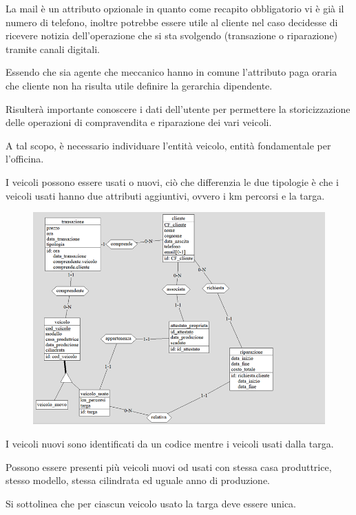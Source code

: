 \documentclass[a4paper,12pt]{report}
\begin{document}
La mail è un attributo opzionale in quanto come recapito obbligatorio vi è già il numero di telefono, inoltre potrebbe essere utile al 
%
cliente nel caso decidesse di ricevere notizia dell’operazione che si sta svolgendo (transazione o riparazione) tramite canali digitali.

Essendo che sia agente che meccanico hanno in comune l’attributo paga oraria che cliente non ha risulta utile definire la gerarchia
%
dipendente.

Risulterà importante conoscere i dati dell’utente per permettere la storicizzazione delle operazioni di compravendita e riparazione 
%
dei vari veicoli.

A tal scopo, è necessario individuare l’entità veicolo, entità fondamentale per l’officina.

I veicoli possono essere usati o nuovi, ciò che differenzia le due tipologie è che i veicoli usati hanno due attributi aggiuntivi, 
%
ovvero i km percorsi e la targa.

	\begin{figure}[H]
		\centering
		\includegraphics[scale=1]{img/raffinamenti.png}
	\end{figure}

I veicoli nuovi sono identificati da un codice mentre i veicoli usati dalla targa.

Possono essere presenti più veicoli nuovi od usati con stessa casa produttrice, stesso modello, stessa cilindrata ed uguale anno di produzione.

Si sottolinea che per ciascun veicolo usato la targa deve essere unica.
\end{document}
